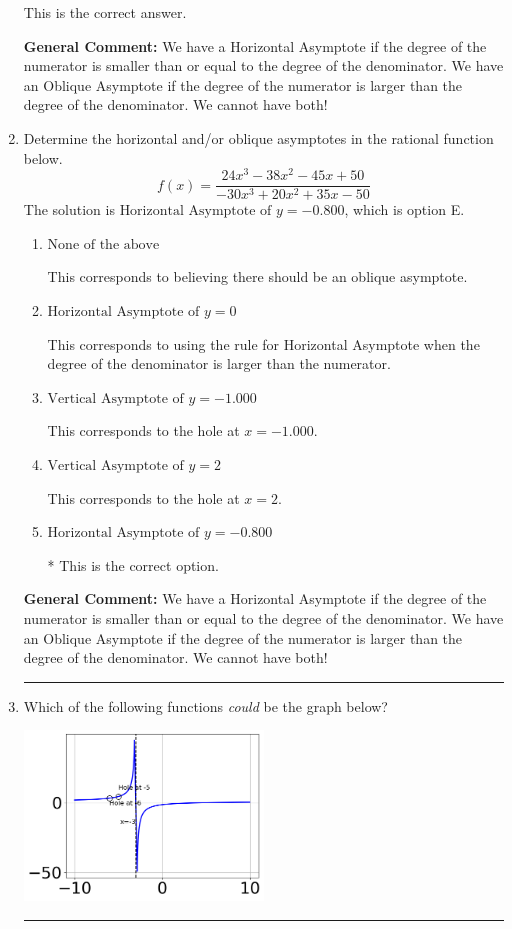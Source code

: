 \documentclass{extbook}[14pt]
\newcommand{\litem}[1]{\item #1

\rule{\textwidth}{0.4pt}}
\begin{document}
\begin{enumerate}
{\begin{enumerate}[label=\Alph*.]
This is the correct answer.
\end{enumerate}

\textbf{General Comment:} We have a Horizontal Asymptote if the degree of the numerator is smaller than or equal to the degree of the denominator. We have an Oblique Asymptote if the degree of the numerator is larger than the degree of the denominator. We cannot have both!
}
\litem{
Determine the horizontal and/or oblique asymptotes in the rational function below.
\[ f(x) = \frac{24x^{3} -38 x^{2} -45 x + 50}{-30x^{3} +20 x^{2} +35 x -50} \]The solution is \( \text{Horizontal Asymptote of } y = -0.800  \), which is option E.\begin{enumerate}[label=\Alph*.]
\item \( \text{None of the above} \)

This corresponds to believing there should be an oblique asymptote.
\item \( \text{Horizontal Asymptote of } y = 0  \)

This corresponds to using the rule for Horizontal Asymptote when the degree of the denominator is larger than the numerator.
\item \( \text{Vertical Asymptote of } y = -1.000  \)

This corresponds to the hole at $x = -1.000$.
\item \( \text{Vertical Asymptote of } y = 2  \)

This corresponds to the hole at $x = 2$.
\item \( \text{Horizontal Asymptote of } y = -0.800  \)

* This is the correct option.
\end{enumerate}

\textbf{General Comment:} We have a Horizontal Asymptote if the degree of the numerator is smaller than or equal to the degree of the denominator. We have an Oblique Asymptote if the degree of the numerator is larger than the degree of the denominator. We cannot have both!
}
\litem{
Which of the following functions \textit{could} be the graph below?

\begin{center}
    \includegraphics[width=0.5\textwidth]{../Figures/identifyGraphOfRationalFunctionCopyC.png}
\end{center}


}
\end{enumerate}
\end{document}
